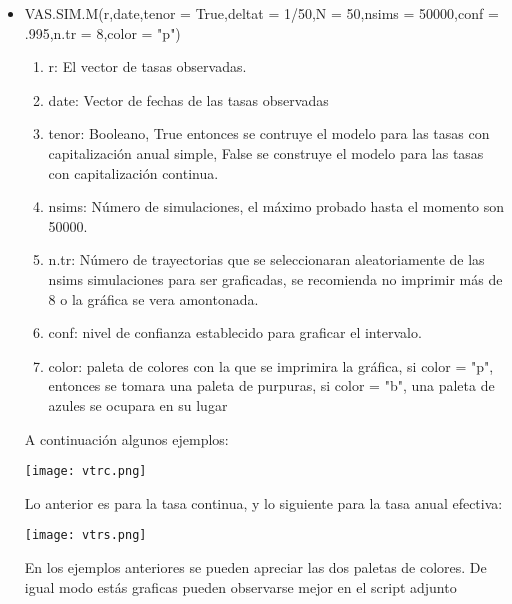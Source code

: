 \documentclass[11pt,notitlepage]{article}
\begin{document}
\begin{itemize}
    \item VAS.SIM.M(r,date,tenor = True,deltat = 1/50,N = 50,nsims = 50000,conf = .995,n.tr = 8,color = "p")
            \begin{enumerate}
                \item r: El vector de tasas observadas. 
                \item date: Vector de fechas de las tasas observadas
                \item tenor: Booleano, True entonces se contruye el modelo para las tasas con capitalización anual simple, False se construye el modelo para las tasas con capitalización continua. 
                \item nsims: Número de simulaciones, el máximo probado hasta el momento son 50000.
                \item n.tr: Número de trayectorias que se seleccionaran aleatoriamente de las nsims simulaciones para ser graficadas, 
                se recomienda no imprimir más de 8 o la gráfica se vera amontonada.
                \item conf: nivel de confianza establecido para graficar el intervalo.
                \item color: paleta de colores con la que se imprimira la gráfica, si color = "p", entonces se tomara una paleta
                de purpuras, si color = "b", una paleta de azules se ocupara en su lugar
            \end{enumerate}
   A continuación algunos ejemplos: 
    \begin{center}
       \texttt{[image: vtrc.png]} 
    \end{center}
  Lo anterior es para la tasa continua, y lo siguiente para la tasa anual efectiva:
    \begin{center}
       \texttt{[image: vtrs.png]} 
    \end{center}
  En los ejemplos anteriores se pueden apreciar las dos paletas de colores. De igual modo estás graficas pueden observarse mejor en el script adjunto
\end{itemize}
\end{document}
